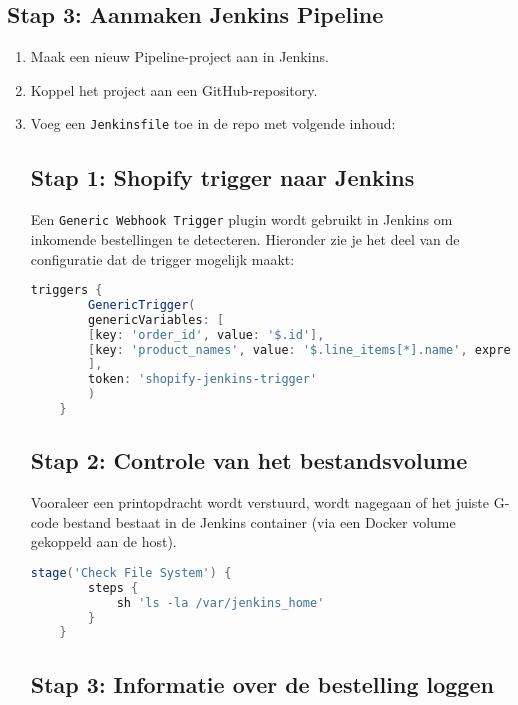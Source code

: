 \subsection{Stap 3: Aanmaken Jenkins Pipeline}
\begin{enumerate}
    \item Maak een nieuw Pipeline-project aan in Jenkins.
    \item Koppel het project aan een GitHub-repository.
    \item Voeg een \texttt{Jenkinsfile} toe in de repo met volgende inhoud:

\subsection*{Stap 1: Shopify trigger naar Jenkins}

Een \texttt{Generic Webhook Trigger} plugin wordt gebruikt in Jenkins om inkomende bestellingen te detecteren. Hieronder zie je het deel van de configuratie dat de trigger mogelijk maakt:

\begin{lstlisting}[language=groovy, caption=Webhook-trigger configuratie in Jenkinsfile]
    triggers {
        GenericTrigger(
        genericVariables: [
        [key: 'order_id', value: '$.id'],
        [key: 'product_names', value: '$.line_items[*].name', expressionType: 'JSONPath']
        ],
        token: 'shopify-jenkins-trigger'
        )
    }
\end{lstlisting}

\subsection*{Stap 2: Controle van het bestandsvolume}

Vooraleer een printopdracht wordt verstuurd, wordt nagegaan of het juiste G-code bestand bestaat in de Jenkins container (via een Docker volume gekoppeld aan de host).

\begin{lstlisting}[language=groovy, caption=Controle van Jenkins volume]
    stage('Check File System') {
        steps {
            sh 'ls -la /var/jenkins_home'
        }
    }
\end{lstlisting}

\subsection*{Stap 3: Informatie over de bestelling loggen}


\end{enumerate}
